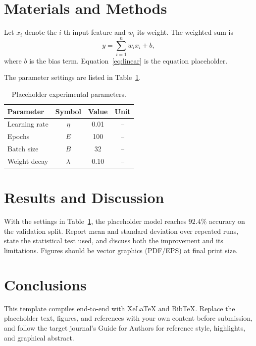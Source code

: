 \documentclass[preprint,review,12pt]{elsarticle}
\begin{document}
\section{Materials and Methods}
\label{sec:method}

Let $x_i$ denote the $i$-th input feature and $w_i$ its weight. The weighted sum is
\begin{equation}
  y=\sum_{i=1}^{n} w_i x_i + b,
  \label{eq:linear}
\end{equation}
where $b$ is the bias term. Equation~\eqref{eq:linear} is the equation placeholder.

The parameter settings are listed in Table~\ref{tab:params}.

\begin{table}[htbp]
  \centering
  \caption{Placeholder experimental parameters.}
  \label{tab:params}
  \begin{tabular}{lccc}
    \toprule
    Parameter & Symbol & Value & Unit \\
    \midrule
    Learning rate & $\eta$    & 0.01 & --  \\
    Epochs        & $E$       & 100  & --  \\
    Batch size    & $B$       & 32   & --  \\
    Weight decay  & $\lambda$ & 0.10 & --  \\
    \bottomrule
  \end{tabular}
\end{table}

\section{Results and Discussion}
\label{sec:results}

With the settings in Table~\ref{tab:params}, the placeholder model reaches 92.4\% accuracy
on the validation split. Report mean and standard deviation over repeated runs, state the
statistical test used, and discuss both the improvement and its limitations. Figures should
be vector graphics (PDF/EPS) at final print size.

\section{Conclusions}
\label{sec:conclusion}

This template compiles end-to-end with XeLaTeX and BibTeX. Replace the placeholder text,
figures, and references with your own content before submission, and follow the target
journal's Guide for Authors for reference style, highlights, and graphical abstract.
\end{document}

